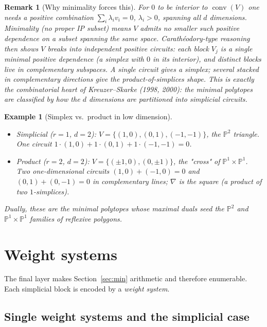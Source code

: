 \documentclass{amsart}
\newtheorem{example}[theorem]{Example}
\newtheorem{remark}[theorem]{Remark}
\begin{document}
\begin{remark}[Why minimality forces this]
For $0$ to be interior to $\operatorname{conv}(V)$ one needs a positive
combination $\sum_i \lambda_i v_i = 0$, $\lambda_i>0$, spanning all $d$
dimensions. Minimality (no proper IP subset) means $V$ admits no
\emph{smaller} such positive dependence on a subset spanning the same space.
Carath\'eodory-type reasoning then shows $V$ breaks into independent
positive circuits: each block $V_j$ is a single minimal positive dependence
(a simplex with $0$ in its interior), and distinct blocks live in
complementary subspaces. A single circuit gives a simplex; several stacked
in complementary directions give the product-of-simplices shape. This is
exactly the combinatorial heart of Kreuzer--Skarke (1998, 2000): the minimal
polytopes are classified by how the $d$ dimensions are partitioned into
simplicial circuits.
\end{remark}

\begin{example}[Simplex vs.\ product in low dimension]\label{ex:minexamples}
\leavevmode
\begin{itemize}
  \item \emph{Simplicial ($r=1$, $d=2$):} $V=\{(1,0),(0,1),(-1,-1)\}$,
        the $\mathbb{P}^2$ triangle. One circuit
        $1\cdot(1,0)+1\cdot(0,1)+1\cdot(-1,-1)=0$.
  \item \emph{Product ($r=2$, $d=2$):} $V=\{(\pm1,0),(0,\pm1)\}$, the
        "cross" of $\mathbb{P}^1\times\mathbb{P}^1$. Two
        one-dimensional circuits $(1,0)+(-1,0)=0$ and $(0,1)+(0,-1)=0$ in
        complementary lines; $\nabla$ is the square (a product of two
        $1$-simplices).
\end{itemize}
Dually, these are the minimal polytopes whose maximal duals seed the
$\mathbb{P}^2$ and $\mathbb{P}^1\times\mathbb{P}^1$ families of reflexive
polygons.
\end{example}

\section{Weight systems}\label{sec:weights}

The final layer makes Section~\ref{sec:min} arithmetic and therefore
enumerable. Each simplicial block is encoded by a \emph{weight system}.

\subsection{Single weight systems and the simplicial case}
\end{document}
